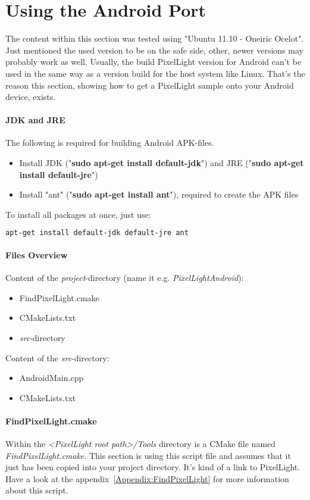 \section{Using the Android Port}
The content within this section was tested using "Ubuntu 11.10 - Oneiric Ocelot". Just mentioned the used version to be on the safe side, other, newer versions may probably work as well. Usually, the build PixelLight version for Android can't be used in the same way as a version build for the host system like Linux. That's the reason this section, showing how to get a PixelLight sample onto your Android device, exists.


\paragraph{\ac{JDK} and \ac{JRE}}
The following is required for building Android \ac{APK}-files.
\begin{itemize}
\item{Install \ac{JDK} ("\textbf{sudo apt-get install default-jdk}") and \ac{JRE} ("\textbf{sudo apt-get install default-jre}")}
\item{Install "ant" ("\textbf{sudo apt-get install ant}"), required to create the \ac{APK} files}
\end{itemize}
To install all packages at once, just use: 
\begin{lstlisting}[language=sh]
apt-get install default-jdk default-jre ant
\end{lstlisting}


\paragraph{Files Overview}
Content of the \emph{project}-directory (name it e.g. \emph{PixelLightAndroid}):
\begin{itemize}
\item{FindPixelLight.cmake}
\item{CMakeLists.txt}
\item{\emph{src}-directory}
\end{itemize}
Content of the \emph{src}-directory:
\begin{itemize}
\item{AndroidMain.cpp}
\item{CMakeLists.txt}
\end{itemize}


\paragraph{FindPixelLight.cmake}
Within the \emph{<PixelLight root path>/Tools} directory is a CMake file named \emph{FindPixelLight.cmake}. This section is using this script file and assumes that it just has been copied into your project directory. It's kind of a link to PixelLight. Have a look at the appendix~\ref{Appendix:FindPixelLight} for more information about this script.


